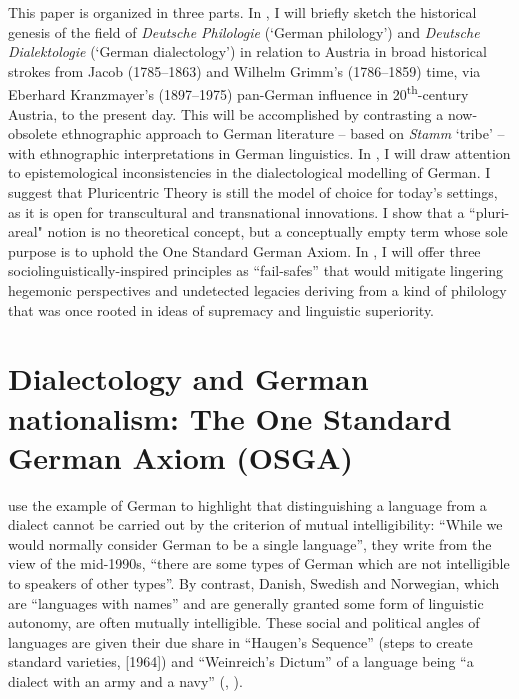 \documentclass[output=paper]{langscibook}
\begin{document}
This paper is organized in three parts. In , I will briefly sketch the historical genesis of the field of \textit{Deutsche Philologie} (`German philology') and \textit{Deutsche Dialektologie} (`German dialectology') in relation to Austria in broad historical strokes from Jacob (1785--1863) and Wilhelm Grimm’s (1786--1859) time, via Eberhard Kranzmayer’s (1897--1975) pan-German influence in 20\textsuperscript{th}{}-century Austria, to the present day. This will be accomplished by contrasting a now-obsolete ethnographic approach to German literature – based on \textit{Stamm} `tribe' – with ethnographic interpretations in German linguistics. In , I will draw attention to epistemological inconsistencies in the dialectological modelling of German. I suggest that Pluricentric Theory \citep{Clyne1995} is still the model of choice for today’s settings, as it is open for transcultural and transnational innovations. I show that a ``pluri-areal" notion is no theoretical concept, but a conceptually empty term whose sole purpose is to uphold the One Standard German Axiom. In , I will offer three sociolinguistically-inspired principles as “fail-safes” that would mitigate lingering hegemonic perspectives and undetected legacies deriving from a kind of  philology that was once rooted in ideas of supremacy and linguistic superiority.

\section{Dialectology and German nationalism: The One Standard German Axiom (OSGA)} \label{sec:dollinger:2}


\citet{ChambersTrudgill1998} use the example of German to highlight that distinguishing a language from a dialect cannot be carried out by the criterion of mutual intelligibility: “While we would normally consider German to be a single language”, they write from the view of the mid-1990s, “there are some types of German which are not intelligible to speakers of other types”. By contrast, Danish, Swedish and Norwegian, which are “languages with names” \citep[51]{Piller2017} and are generally granted some form of linguistic autonomy, are often mutually intelligible. These social and political angles of languages are given their due share in “Haugen’s Sequence” (steps to create standard varieties, \citealt{Haugen1972} [1964]) and “Weinreich’s Dictum” of a language being “a dialect with an army and a navy” (\citealt{Weinreich1945}, \citealt[125--126]{Dollinger2023c}).
\end{document}
